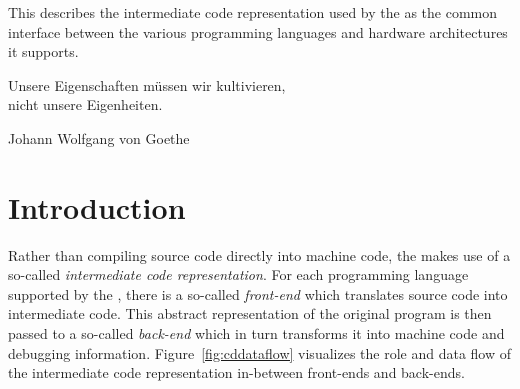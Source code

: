 




\renewcommand{\seecode}{}

{This \documentation{} describes the intermediate code representation used by the \ecs{} as the
common interface between the various programming languages and hardware architectures it supports.}

\epigraph{Unsere Eigenschaften m\"ussen wir kultivieren, \\ nicht unsere Eigenheiten.}{Johann Wolfgang von Goethe}

\section{Introduction}

Rather than compiling source code directly into machine code, the \ecs{} makes use of a so-called \emph{intermediate code representation}.
For each programming language supported by the \ecs{}, there is a so-called \emph{front-end} which translates source code into intermediate code.
This abstract representation of the original program is then passed to a so-called \emph{back-end} which in turn transforms it into machine code and debugging information.
Figure~\ref{fig:cddataflow} visualizes the role and data flow of the intermediate code representation in-between front-ends and back-ends.

